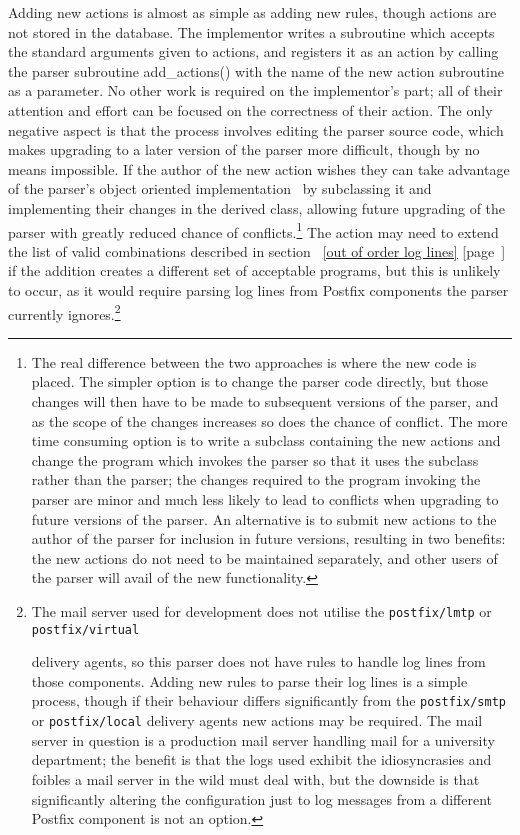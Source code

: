 \documentclass[a4paper,12pt,draft]{article}
\newcommand{\refwithpage}[1]{%
    \empty{}\ref{#1} [page~\pageref{#1}]%
}
\newcommand{\daemon}[1]{%
    \texttt{postfix/#1}%
}
\begin{document}
Adding new actions is almost as simple as adding new rules, though actions
are not stored in the database.  The implementor writes a subroutine which
accepts the standard arguments given to actions, and registers it as an
action by calling the parser subroutine add\_actions() with the name of the
new action subroutine as a parameter.  No other work is required on the
implementor's part; all of their attention and effort can be focused on the
correctness of their action.  The only negative aspect is that the process
involves editing the parser source code, which makes upgrading to a later
version of the parser more difficult, though by no means impossible.  If
the author of the new action wishes they can take advantage of the parser's
object oriented implementation~\cite{Wikipedia-object-orientation} by
subclassing it and implementing their changes in the derived class,
allowing future upgrading of the parser with greatly reduced chance of
conflicts.\footnote{The real difference between the two approaches is where
the new code is placed.  The simpler option is to change the parser code
directly, but those changes will then have to be made to subsequent
versions of the parser, and as the scope of the changes increases so does
the chance of conflict.  The more time consuming option is to write a
subclass containing the new actions and change the program which invokes
the parser so that it uses the subclass rather than the parser; the changes
required to the program invoking the parser are minor and much less likely
to lead to conflicts when upgrading to future versions of the parser.  An
alternative is to submit new actions to the author of the parser for
inclusion in future versions, resulting in two benefits: the new actions do
not need to be maintained separately, and other users of the parser will
avail of the new functionality.} The action may need to extend the list of
valid combinations described in section~\refwithpage{out of order log
lines} if the addition creates a different set of acceptable programs, but
this is unlikely to occur, as it would require parsing log lines from
Postfix components the parser currently ignores.\footnote{The mail server
used for development does not utilise the \daemon{lmtp} or \daemon{virtual}
delivery agents, so this parser does not have rules to handle log lines
from those components.  Adding new rules to parse their log lines is a
simple process, though if their behaviour differs significantly from the
\daemon{smtp} or \daemon{local} delivery agents new actions may be
required.  The mail server in question is a production mail server handling
mail for a university department; the benefit is that the logs used exhibit
the idiosyncrasies and foibles a mail server in the wild must deal with,
but the downside is that significantly altering the configuration just to
log messages from a different Postfix component is not an option.}
\end{document}
